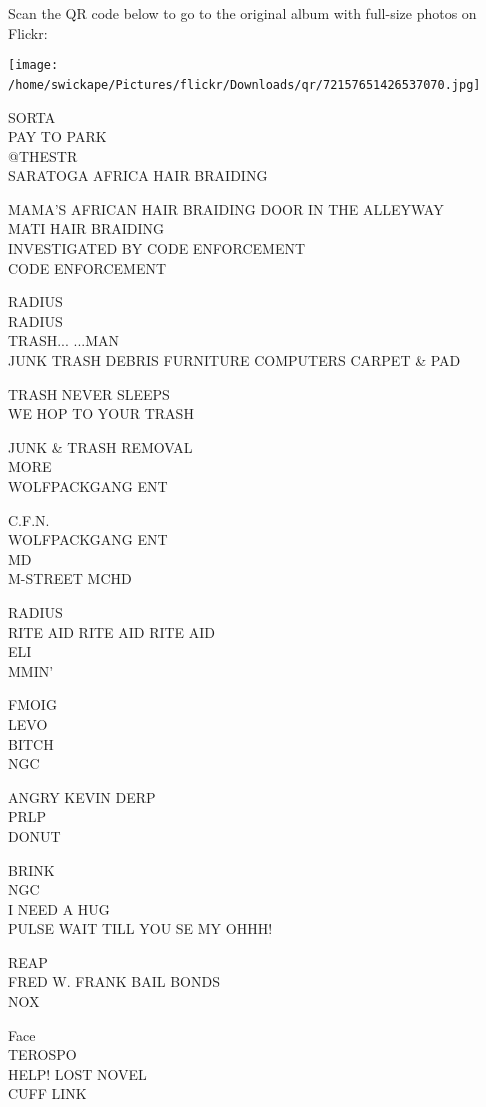 \documentclass[10pt,letterpaper]{article}
\begin{document}
Scan the QR code below to go to the original album with full-size photos on Flickr:

\texttt{[image: /home/swickape/Pictures/flickr/Downloads/qr/72157651426537070.jpg]}
\

SORTA\\
PAY TO PARK\\
@THESTR\\
SARATOGA AFRICA HAIR BRAIDING

MAMA'S AFRICAN HAIR BRAIDING DOOR IN THE ALLEYWAY\\
MATI HAIR BRAIDING\\
INVESTIGATED BY CODE ENFORCEMENT\\
CODE ENFORCEMENT

RADIUS\\
RADIUS\\
TRASH... ...MAN\\
JUNK TRASH DEBRIS FURNITURE COMPUTERS CARPET \& PAD

TRASH NEVER SLEEPS\\
WE HOP TO YOUR TRASH

JUNK \& TRASH REMOVAL\\
MORE\\
WOLFPACKGANG ENT

C.F.N.\\
WOLFPACKGANG ENT\\
MD\\
M{-}STREET MCHD

RADIUS\\
RITE AID RITE AID RITE AID\\
ELI\\
MMIN'

FMOIG\\
LEVO\\
BITCH\\
NGC

ANGRY KEVIN DERP\\
PRLP\\
DONUT

BRINK\\
NGC\\
I NEED A HUG\\
PULSE WAIT TILL YOU SE MY OHHH!

REAP\\
FRED W. FRANK BAIL BONDS\\
NOX

Face\\
TEROSPO\\
HELP!  LOST NOVEL\\
CUFF LINK
\end{document}
